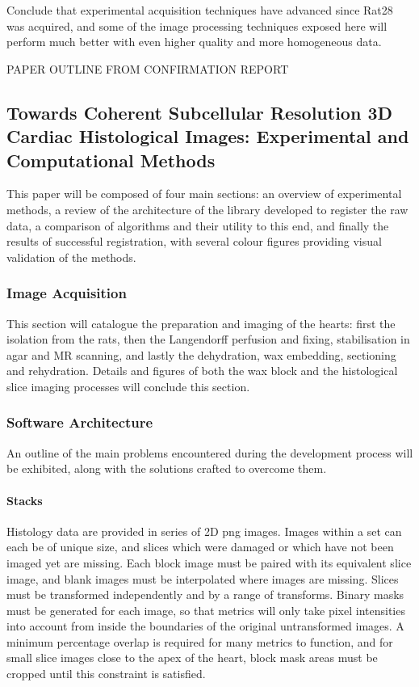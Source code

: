     Conclude that experimental acquisition techniques have advanced since Rat28 was acquired, and some of the image processing techniques exposed here will perform much better with even higher quality and more homogeneous data.
    

PAPER OUTLINE FROM CONFIRMATION REPORT
\subsection{Towards Coherent Subcellular Resolution 3D Cardiac Histological Images: Experimental and Computational Methods}
  This paper will be composed of four main sections: an overview of experimental methods, a review of the architecture of the library developed to register the raw data, a comparison of algorithms and their utility to this end, and finally the results of successful registration, with several colour figures providing visual validation of the methods.

  \subsubsection{Image Acquisition}
    This section will catalogue the preparation and imaging of the hearts: first the isolation from the rats, then the Langendorff perfusion and fixing, stabilisation in agar and MR scanning, and lastly the dehydration, wax embedding, sectioning and rehydration. Details and figures of both the wax block and the histological slice imaging processes will conclude this section.

    \subsubsection{Software Architecture}
      An outline of the main problems encountered during the development process will be exhibited, along with the solutions crafted to overcome them.
      
      \paragraph{Stacks}
        Histology data are provided in series of 2D png images. Images within a set can each be of unique size, and slices which were damaged or which have not been imaged yet are missing. Each block image must be paired with its equivalent slice image, and blank images must be interpolated where images are missing. Slices must be transformed independently and by a range of transforms. Binary masks must be generated for each image, so that metrics will only take pixel intensities into account from inside the boundaries of the original untransformed images. A minimum percentage overlap is required for many metrics to function, and for small slice images close to the apex of the heart, block mask areas must be cropped until this constraint is satisfied.
        
